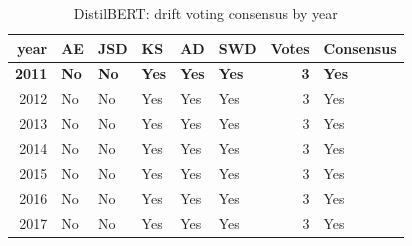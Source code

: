 \begin{table}[ht]
\centering
\caption{DistilBERT: drift voting consensus by year}
\label{tab:distilbert_consensus}
\begin{tabular}{rlllllrl}
\toprule
year & AE & JSD & KS & AD & SWD & Votes & Consensus \\
\midrule
\textbf{2011} & \textbf{No} & \textbf{No} & \textbf{Yes} & \textbf{Yes} & \textbf{Yes} & \textbf{3} & \textbf{Yes} \\
2012 & No & No & Yes & Yes & Yes & 3 & Yes \\
2013 & No & No & Yes & Yes & Yes & 3 & Yes \\
2014 & No & No & Yes & Yes & Yes & 3 & Yes \\
2015 & No & No & Yes & Yes & Yes & 3 & Yes \\
2016 & No & No & Yes & Yes & Yes & 3 & Yes \\
2017 & No & No & Yes & Yes & Yes & 3 & Yes \\
\bottomrule
\end{tabular}
\end{table}

